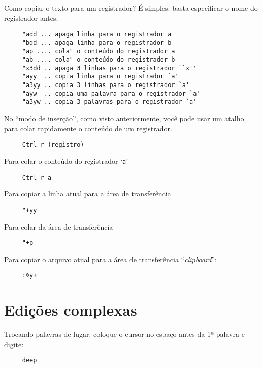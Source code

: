 Como copiar o texto para um registrador? É simples: basta especificar
o nome do registrador antes:

\begin{verbatim}
     "add ... apaga linha para o registrador a
     "bdd ... apaga linha para o registrador b
     "ap .... cola" o conteúdo do registrador a
     "ab .... cola" o conteúdo do registrador b
     "x3dd .. apaga 3 linhas para o registrador ``x''
     "ayy  .. copia linha para o registrador `a'
     "a3yy .. copia 3 linhas para o registrador `a'
     "ayw  .. copia uma palavra para o registrador `a'
     "a3yw .. copia 3 palavras para o registrador `a'
\end{verbatim}

No ``modo de inserção'', como visto anteriormente, você pode usar um atalho
para colar rapidamente o conteúdo de um registrador.

\begin{verbatim}
     Ctrl-r (registro)
\end{verbatim}

Para colar o conteúdo do registrador `{\tt a}'

\begin{verbatim}
     Ctrl-r a
\end{verbatim}

Para copiar a linha atual para a área de transferência

\begin{verbatim}
     "+yy
\end{verbatim}

Para colar da área de transferência

\begin{verbatim}
     "+p
\end{verbatim}

Para copiar o arquivo atual para a área de transferência ``{\em clipboard}'':

\begin{verbatim}
     :%y+
\end{verbatim}

\section{Edições complexas }
\label{Edições complexas }

Trocando palavras de lugar: coloque o cursor no espaço antes da 1ª palavra e digite:

\begin{verbatim}
     deep
\end{verbatim}

